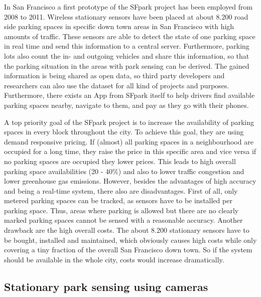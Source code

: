 In San Francisco a first prototype of the SFpark project \cite{SFPark} has been employed from 2008 to 2011. Wireless stationary sensors have been placed at about 8.200 road side parking spaces in specific down town areas in San Francisco with high amounts of traffic. These sensors are able to detect the state of one parking space in real time and send this information to a central server. Furthermore, parking lots also count the in- and outgoing vehicles and share this information, so that the parking situation in the areas with park sensing can be derived. The gained information is being shared as open data, so third party developers and researchers can also use the dataset for all kind of projects and purposes. Furthermore, there exists an App from SFpark itself to help drivers find available parking spaces nearby, navigate to them, and pay as they go with their phones.

A top priority goal of the SFpark project is to increase the availability of parking spaces in every block throughout the city. To achieve this goal, they are using demand responsive pricing. If (almost) all parking spaces in a neighbourhood are occupied for a long time, they raise the price in this specific area and vice versa if no parking spaces are occupied they lower prices. This leads to high overall parking space availabilities (20 - 40\%) and also to lower traffic congestion and lower greenhouse gas emissions. However, besides the advantages of high accuracy and being a real-time system, there also are disadvantages. First of all, only metered parking spaces can be tracked, as sensors have to be installed per parking space. Thus, areas where parking is allowed but there are no clearly marked parking spaces cannot be sensed with a reasonable accuracy. Another drawback are the high overall costs. The about 8.200 stationary sensors have to be bought, installed and maintained, which obviously causes high costs while only covering a tiny fraction of the overall San Francisco down town. So if the system should be available in the whole city, costs would increase dramatically.






\subsection{Stationary park sensing using cameras}
\label{sec:stationary_park_sensing_cameras}

